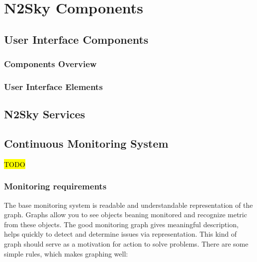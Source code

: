 \section{N2Sky Components}\label{N2Sky Components}

\subsection{User Interface Components}\label{User Interface Components}
\subsubsection{Components Overview}\label{Components Overview}
\subsubsection{User Interface Elements}\label{User Interface Elements}

\subsection{N2Sky Services}\label{N2Sky Services}

\subsection{Continuous Monitoring System}\label{Continuous Monitoring System}
\hl{TODO}
\subsubsection{Monitoring requirements}\label{Monitoring requirements}

The base monitoring system is readable and understandable representation of the graph. Graphs allow you to see objects beaning monitored and recognize metric from these objects. 
The good monitoring graph gives meaningful description, helps quickly to detect and determine issues via representation. This kind of graph should serve as a motivation for action to solve problems. 
There are some simple rules, which makes graphing well:

